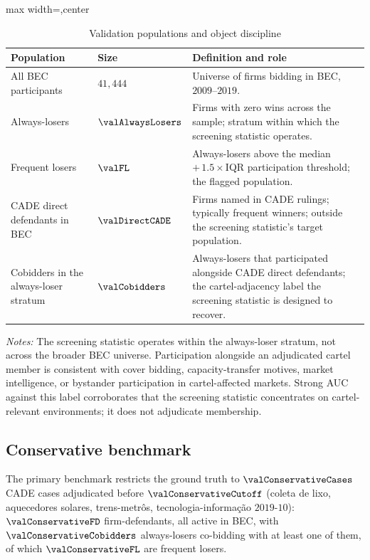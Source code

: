 \begin{table}[htbp]
\centering
\caption{Validation populations and object discipline}
\label{tab:cade_populations}
\footnotesize
\begin{adjustbox}{max width=\textwidth,center}
\begin{tabular}{p{4.0cm}p{2.0cm}p{6.5cm}}
\toprule
Population & Size & Definition and role \\
\midrule
All BEC participants & $41{,}444$ & Universe of firms bidding in BEC, $2009$--$2019$. \\
Always-losers & $\valAlwaysLosers$ & Firms with zero wins across the sample; stratum within which the screening statistic operates. \\
Frequent losers & $\valFL$ & Always-losers above the median $+\,1.5\!\times$IQR participation threshold; the flagged population. \\
CADE direct defendants in BEC & $\valDirectCADE$ & Firms named in CADE rulings; typically frequent winners; outside the screening statistic's target population. \\
Cobidders in the always-loser stratum & $\valCobidders$ & Always-losers that participated alongside CADE direct defendants; the cartel-adjacency label the screening statistic is designed to recover. \\
\bottomrule
\end{tabular}
\end{adjustbox}

\smallskip
{\footnotesize\textit{Notes:} The screening statistic operates
within the always-loser stratum, not across the broader BEC
universe. Participation alongside an adjudicated cartel member
is consistent with cover bidding, capacity-transfer motives,
market intelligence, or bystander participation in
cartel-affected markets. Strong AUC against this label
corroborates that the screening statistic concentrates on
cartel-relevant environments; it does not adjudicate
membership.\par}
\end{table}

\subsection{Conservative benchmark}
\label{sec:cade_contemporaneous}

The primary benchmark restricts the ground truth to
$\valConservativeCases$ CADE cases adjudicated before
$\valConservativeCutoff$ (coleta de lixo, aquecedores solares,
trens-metr\^os, tecnologia-informa\c{c}\~ao $2019$-$10$):
$\valConservativeFD$ firm-defendants, all active in BEC, with
$\valConservativeCobidders$ always-losers co-bidding with at
least one of them, of which $\valConservativeFL$ are frequent
losers.

